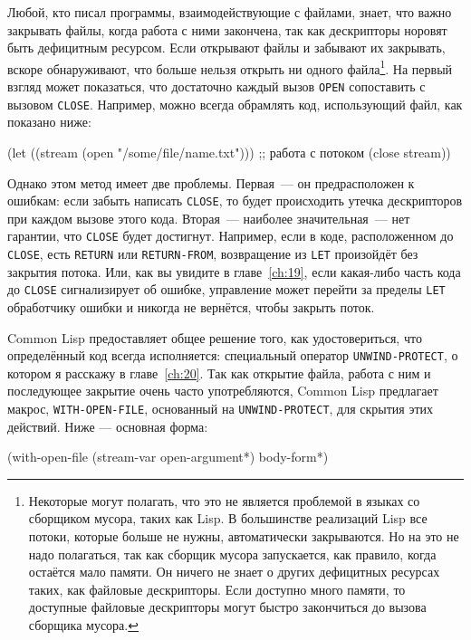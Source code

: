 Любой, кто писал программы, взаимодействующие с файлами, знает, что важно закрывать файлы,
когда работа с ними закончена, так как дескрипторы норовят быть дефицитным ресурсом. Если
открывают файлы и забывают их закрывать, вскоре обнаруживают, что больше нельзя открыть ни
одного файла\footnote{Некоторые могут полагать, что это не является проблемой в языках со
  сборщиком мусора, таких как Lisp. В большинстве реализаций Lisp все потоки, которые
  больше не нужны, автоматически закрываются. Но на это не надо полагаться, так как
  сборщик мусора запускается, как правило, когда остаётся мало памяти. Он ничего не знает
  о других дефицитных ресурсах таких, как файловые дескрипторы. Если доступно много
  памяти, то доступные файловые дескрипторы могут быстро закончиться до вызова сборщика
  мусора.}. На первый взгляд может показаться, что достаточно каждый вызов \lstinline{OPEN}
сопоставить с вызовом \lstinline{CLOSE}. Например, можно всегда обрамлять код, использующий
файл, как показано ниже:

\begin{myverb}
(let ((stream (open "/some/file/name.txt"))) 
  ;; работа с потоком
  (close stream)) 
\end{myverb}

Однако этом метод имеет две проблемы. Первая~--- он предрасположен к ошибкам: если забыть
написать \lstinline{CLOSE}, то будет происходить утечка дескрипторов при каждом вызове этого
кода. Вторая~--- наиболее значительная~--- нет гарантии, что \lstinline{CLOSE} будет
достигнут. Например, если в коде, расположенном до \lstinline{CLOSE}, есть \lstinline{RETURN} или
\lstinline{RETURN-FROM}, возвращение из \lstinline{LET} произойдёт без закрытия потока. Или, как вы
увидите в главе~\ref{ch:19}, если какая-либо часть кода до \lstinline{CLOSE} сигнализирует об
ошибке, управление может перейти за пределы \lstinline{LET} обработчику ошибки и никогда не
вернётся, чтобы закрыть поток.

Common Lisp предоставляет общее решение того, как удостовериться, что определённый код
всегда исполняется: специальный оператор \lstinline{UNWIND-PROTECT}, о котором я расскажу в
главе~\ref{ch:20}. Так как открытие файла, работа с ним и последующее закрытие очень часто
употребляются, Common Lisp предлагает макрос, \lstinline{WITH-OPEN-FILE}, основанный на
\lstinline{UNWIND-PROTECT}, для скрытия этих действий. Ниже — основная форма:

\begin{myverb}
(with-open-file (stream-var open-argument*) 
  body-form*) 
\end{myverb}

